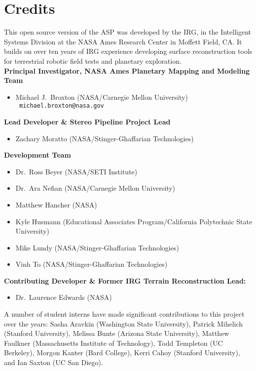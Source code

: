 
\chapter*{Credits}

This open source version of the \ac{ASP} was developed by the
\ac{IRG}, in the Intelligent Systems Division at the \ac{NASA} Ames
Research Center in Moffett Field, CA. It builds on over ten years
of IRG experience developing surface reconstruction tools for
terrestrial robotic field tests and planetary exploration. \\

{\bf Principal Investigator, NASA Ames Planetary Mapping and Modeling Team}
\begin {itemize} 
\item Michael J.~Broxton (NASA/Carnegie Mellon University)\\ {\tt
  michael.broxton@nasa.gov}\\
\end{itemize}

{\bf Lead Developer \& Stereo Pipeline Project Lead}
\begin {itemize} 
\item Zachary Moratto (NASA/Stinger-Ghaffarian Technologies)
\end{itemize}

{\bf Development Team}
\begin{itemize}
\item Dr.~Ross Beyer (NASA/SETI Institute)
\item Dr.~Ara Nefian (NASA/Carnegie Mellon University)
\item Matthew Hancher (NASA)
\item Kyle Husmann (Educational Associates Program/California Polytechnic State University)
\item Mike Lundy (NASA/Stinger-Ghaffarian Technologies)
\item Vinh To (NASA/Stinger-Ghaffarian Technologies)
\end{itemize}

{\bf Contributing Developer \& Former IRG Terrain Reconstruction Lead:}
\begin{itemize}
\item Dr.\ Laurence Edwards (NASA)
\end{itemize}

A number of student interns have made significant contributions to
this project over the years: Sasha Aravkin (Washington State
University), Patrick
Mihelich (Stanford University), Melissa Bunte (Arizona State
University), Matthew Faulkner (Massachusetts Institute of Technology),
Todd Templeton (UC Berkeley), Morgon Kanter (Bard College), Kerri
Cahoy (Stanford University), and Ian Saxton (UC San Diego).

